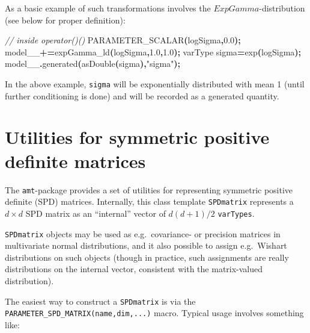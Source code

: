 \documentclass[
]{book}
\newenvironment{Shaded}{\begin{snugshade}}{\end{snugshade}}
\newcommand{\CommentTok}[1]{\textcolor[rgb]{0.56,0.35,0.01}{\textit{#1}}}
\newcommand{\FloatTok}[1]{\textcolor[rgb]{0.00,0.00,0.81}{#1}}
\newcommand{\NormalTok}[1]{#1}
\newcommand{\OperatorTok}[1]{\textcolor[rgb]{0.81,0.36,0.00}{\textbf{#1}}}
\newcommand{\StringTok}[1]{\textcolor[rgb]{0.31,0.60,0.02}{#1}}
\begin{document}
As a basic example of such transformations involves the \(ExpGamma\)-distribution (see below for proper definition):

\begin{Shaded}
\begin{Highlighting}[]
\CommentTok{// inside operator()()}
\NormalTok{PARAMETER\_SCALAR}\OperatorTok{(}\NormalTok{logSigma}\OperatorTok{,}\FloatTok{0.0}\OperatorTok{);}
\NormalTok{model\_\_}\OperatorTok{+=}\NormalTok{expGamma\_ld}\OperatorTok{(}\NormalTok{logSigma}\OperatorTok{,}\FloatTok{1.0}\OperatorTok{,}\FloatTok{1.0}\OperatorTok{);}
\NormalTok{varType sigma}\OperatorTok{=}\NormalTok{exp}\OperatorTok{(}\NormalTok{logSigma}\OperatorTok{);} 
\NormalTok{model\_\_}\OperatorTok{.}\NormalTok{generated}\OperatorTok{(}\NormalTok{asDouble}\OperatorTok{(}\NormalTok{sigma}\OperatorTok{),}\StringTok{"sigma"}\OperatorTok{);}
\end{Highlighting}
\end{Shaded}

In the above example, \texttt{sigma} will be exponentially distributed with mean 1 (until further conditioning is done) and will be recorded as a generated quantity.

\hypertarget{amt-SPD-matrix}{%
\section{Utilities for symmetric positive definite matrices}\label{amt-SPD-matrix}}

The \texttt{amt}-package provides a set of utilities for representing symmetric positive definite (SPD) matrices. Internally, this class template \texttt{SPDmatrix} represents a \(d \times d\) SPD matrix as an ``internal'' vector of \(d(d+1)/2\) \texttt{varTypes}.

\texttt{SPDmatrix} objects may be used as e.g.~covariance- or precision matrices in multivariate normal distributions, and it also possible to assign e.g.~Wishart distributions on such objects (though in practice, such assignments are really distributions on the internal vector, consistent with the matrix-valued distribution).

The easiest way to construct a \texttt{SPDmatrix} is via the \texttt{PARAMETER\_SPD\_MATRIX(name,dim,...)} macro. Typical usage involves something like:
\end{document}

